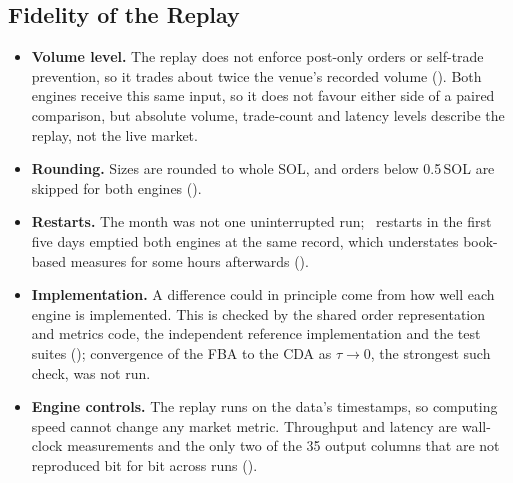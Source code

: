 \subsection{Fidelity of the Replay}
\label{sec:limitsreplay}

\begin{itemize}
  \item \textbf{Volume level.} The replay does not enforce post-only orders
  or self-trade prevention, so it trades about twice the venue's recorded
  volume (). Both engines receive this same input, so
  it does not favour either side of a paired comparison, but absolute
  volume, trade-count and latency levels describe the replay, not the live
  market.
  \item \textbf{Rounding.} Sizes are rounded to whole SOL, and orders below
  0.5\,SOL are skipped for both engines ().
  \item \textbf{Restarts.} The month was not one uninterrupted run;
  \VerResetN\ restarts in the first five days emptied both engines at the
  same record, which understates book-based measures for some hours
  afterwards ().
  \item \textbf{Implementation.} A difference could in principle come from
  how well each engine is implemented. This is checked by the shared order
  representation and metrics code, the independent reference implementation
  and the test suites (); convergence of the FBA to the
  CDA as $\tau \to 0$, the strongest such check, was not run.
  \item \textbf{Engine controls.} The replay runs on the data's timestamps,
  so computing speed cannot change any market metric. Throughput and
  latency are wall-clock measurements and the only two of the 35 output
  columns that are not reproduced bit for bit across runs
  ().
\end{itemize}

